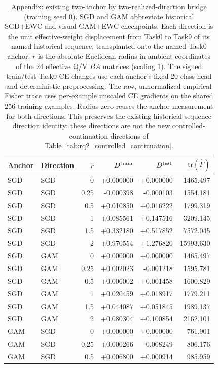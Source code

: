 \begin{table}[t]
\centering
\small
\caption{Appendix: existing two-anchor by two-realized-direction bridge (training seed 0). SGD and GAM abbreviate historical SGD+EWC and visual GAM+EWC checkpoints. Each direction is the unit effective-weight displacement from Task0 to Task9 of its named historical sequence, transplanted onto the named Task0 anchor; $r$ is the absolute Euclidean radius in ambient coordinates of the 24 effective Q/V $BA$ matrices (scaling 1). The signed train/test Task0 CE changes use each anchor's fixed 20-class head and deterministic preprocessing. The raw, unnormalized empirical Fisher trace uses per-example unscaled CE gradients on the shared 256 training examples. Radius zero reuses the anchor measurement for both directions. This preserves the existing historical-sequence direction identity: these directions are not the new controlled-continuation directions of Table~\ref{tab:rq2_controlled_continuation}.}
\label{tab:rq2_existing_bridge}
\begin{tabular}{llrrrr}
\toprule
Anchor & Direction & $r$ & $D^{\rm train}$ & $D^{\rm test}$ & $\mathrm{tr}(\widehat F)$ \\
\midrule
SGD & SGD & 0 & +0.000000 & +0.000000 & 1465.497 \\
SGD & SGD & 0.25 & -0.000398 & -0.000103 & 1554.181 \\
SGD & SGD & 0.5 & +0.010850 & +0.016222 & 1799.319 \\
SGD & SGD & 1 & +0.085561 & +0.147516 & 3209.145 \\
SGD & SGD & 1.5 & +0.332180 & +0.517852 & 7572.045 \\
SGD & SGD & 2 & +0.970554 & +1.276820 & 15993.630 \\
SGD & GAM & 0 & +0.000000 & +0.000000 & 1465.497 \\
SGD & GAM & 0.25 & +0.002023 & -0.001218 & 1595.781 \\
SGD & GAM & 0.5 & +0.006002 & +0.001458 & 1600.829 \\
SGD & GAM & 1 & +0.020459 & +0.018917 & 1779.211 \\
SGD & GAM & 1.5 & +0.044087 & +0.051845 & 1989.137 \\
SGD & GAM & 2 & +0.080304 & +0.100854 & 2162.101 \\
GAM & SGD & 0 & +0.000000 & +0.000000 & 761.901 \\
GAM & SGD & 0.25 & +0.000266 & -0.008249 & 806.176 \\
GAM & SGD & 0.5 & +0.006800 & +0.000914 & 985.959 \\

\end{tabular}
\end{table}
